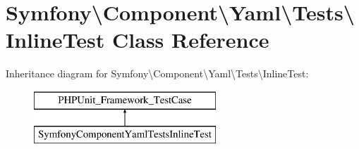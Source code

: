 \hypertarget{classSymfony_1_1Component_1_1Yaml_1_1Tests_1_1InlineTest}{}\section{Symfony\textbackslash{}Component\textbackslash{}Yaml\textbackslash{}Tests\textbackslash{}Inline\+Test Class Reference}
\label{classSymfony_1_1Component_1_1Yaml_1_1Tests_1_1InlineTest}
Inheritance diagram for Symfony\textbackslash{}Component\textbackslash{}Yaml\textbackslash{}Tests\textbackslash{}Inline\+Test\+:\begin{figure}[H]
\begin{center}
\leavevmode
\includegraphics[height=2.000000cm]{classSymfony_1_1Component_1_1Yaml_1_1Tests_1_1InlineTest}
\end{center}
\end{figure}
